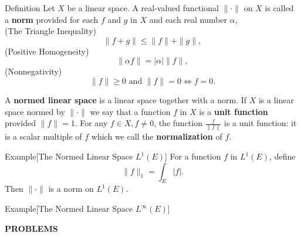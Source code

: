 \begin{flushleft}
	\begin{namedthm*}{Definition}
		Let $X$ be a linear space.
		A real-valued functional $\|\cdot\|$  on $X$ is called a \textbf{norm} provided for each $f$ and $g$ in $X$ and each real number $\alpha$,\\
		(The Triangle Inequality)
		\[
			\|f+g\|\le\|f\|+\|g\|,
		\]
		(Positive Homogeneity)
		\[
			\|\alpha f\|=|\alpha|\|f\|,	
		\]
		(Nonnegativity)
		\[
			\|f\|\ge 0\text{ and }\|f\|=0 \iff f=0.
		\]
	\end{namedthm*}
	A \textbf{normed linear space} is a linear space together with a norm.
	If $X$ is a linear space normed by $\|\cdot\|$ we say that a function $f$ in $X$ is a \textbf{unit function} provided $\|f\|=1$.
	For any $f\in X,f\neq 0$, the function $\frac{f}{\|f\|}$ is a unit function: it is a scalar multiple of $f$ which we call the \textbf{normalization} of $f$.

	\begin{namedthm*}{Example}[The Normed Linear Space $L^1(E)$]
		For a function $f$ in $L^1(E)$, define
		\[
		\|f\|_1=\int_E|f|.	
		\]
		Then $\|\cdot\|$ is a norm on $L^1(E)$.\\

	\end{namedthm*}

	\begin{namedthm*}{Example}[The Normed Linear Space $L^\infty(E)$]
		
	\end{namedthm*}

\end{flushleft}
\begin{center}
	\textbf{PROBLEMS}
\end{center}
